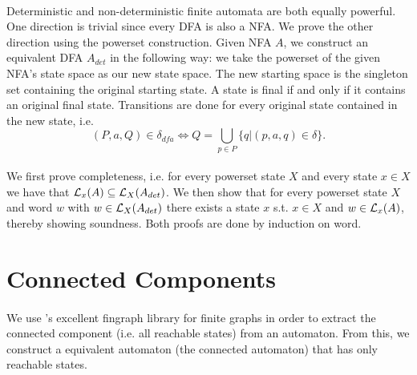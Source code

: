 \documentclass[11pt,a4paper,oneside]{book}
\begin{document}
                    \paragraph{} 
                        Deterministic and non-deterministic finite automata are both equally powerful. 
                        One direction is trivial since every DFA is also a NFA. 
                        We prove the other direction using the powerset construction. 
                        Given NFA $A$, we construct an equivalent DFA $A_{det}$ in the following way:
                        we take the powerset of the given NFA's state space as our new state space. 
                        The new starting space is the singleton set containing the original starting state. 
                        A state is final if and only if it contains an original final state. 
                        Transitions are done for every original state contained in the new state, i.e. 
                        \[
                            (P, a, Q) \in \delta_{dfa} \Longleftrightarrow Q = \bigcup \limits _{p \in P} \{ q | (p,a,q) \in \delta \}.
                        \]

                    \vspace{-0.4cm}
                    \vspace{-0.4cm}

                    \paragraph{}
                        We first prove completeness, i.e. for every powerset state $X$ and every state $x \in X$ we have that $\mathcal{L}_x(A) \subseteq \mathcal{L}_X(A_{det})$. We then show that for every powerset state $X$ and word $w$ with $w \in \mathcal{L}_X(A_{det})$ there exists a state $x$ s.t. $x \in X$ and $w \in \mathcal{L}_x(A)$, thereby showing soundness. Both proofs are done by induction on word.

        \section{Connected Components}
            \paragraph{} 
            We use \ssreflect's excellent fingraph library for finite graphs in order to extract the connected component (i.e. all reachable states) from an automaton.
            From this, we construct a equivalent automaton (the connected automaton) that has only reachable states.
\end{document}
